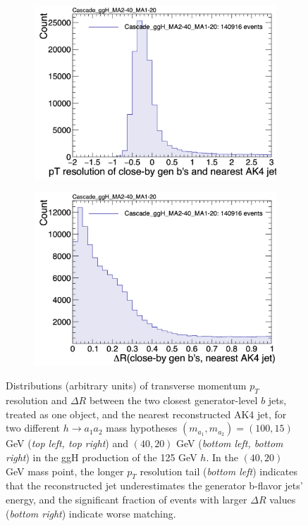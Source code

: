 \begin{figure}[ht]
\begin{subfigure}{0.45\textwidth}
        \includegraphics[width=1.0\textwidth]{figures/ch-11-asymmetric/Cascade_ggH_MA2-40_MA1-20_pt_resolution_ak4_leadingPair}
    \end{subfigure}
    \hfill
    \begin{subfigure}{0.45\textwidth}
        \includegraphics[width=1.0\textwidth]{figures/ch-11-asymmetric/Cascade_ggH_MA2-40_MA1-20_deltaR_ak4_leadingPair}
    \end{subfigure}     
    \caption{Distributions (arbitrary units) of transverse momentum $p_{T}$ resolution and $\Delta R$ between the two closest generator-level $b$ jets, treated as one object, and the nearest reconstructed AK4 jet, for two different $h\rightarrow a_1 a_2$ mass hypotheses $(m_{a_1}, m_{a_2}) = (100, 15)$ GeV (\textit{top left, top right}) and $(40, 20)$ GeV (\textit{bottom left, bottom right}) in the ggH production of the 125 GeV $h$. In the $(40, 20)$ GeV mass point, the longer $p_{T}$ resolution tail (\textit{bottom left}) indicates that the reconstructed jet underestimates the generator b-flavor jets' energy, and the significant fraction of events with larger $\Delta R$ values (\textit{bottom right}) indicate worse matching.}
    \label{fig:cascade_matching_to_AK4_jets}
\end{figure}



